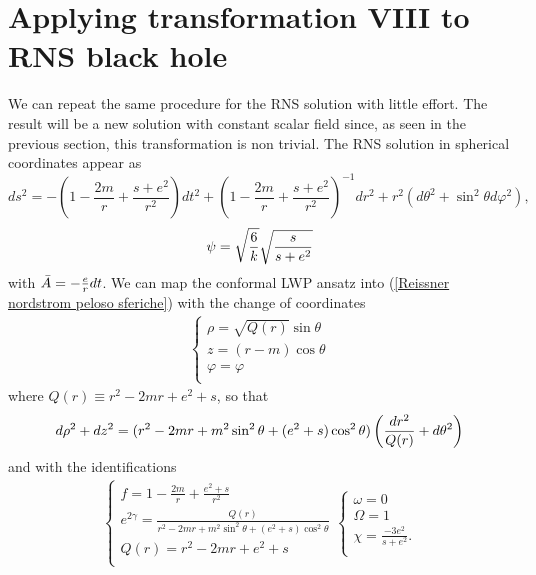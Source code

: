 \section{Applying transformation VIII to RNS black hole} \label{Capitolo RNS + VIII}
We can repeat the same procedure for the RNS solution with little effort. The result will be a new solution with constant scalar field since, as seen in the previous section, this transformation is non trivial.
The RNS solution in spherical coordinates appear as 
\begin{equation}
    ds^2 = -\left(1 -\frac{2m}{r}+\frac{s+e^2}{r^2} \right) dt^2 + \left(1 -\frac{2m}{r}+\frac{s+e^2}{r^2} \right)^{-1} dr^2 + r^2\left(d\theta^2+\sin^2\theta d\varphi^2\right),
    \label{Reissner nordstrom peloso sferiche}
\end{equation}
\begin{equation}
    \psi = \sqrt{\frac{6}{k}}\sqrt{\frac{s}{s+e^2}}
    \notag
\end{equation}
with $\Bar{A} = -\frac{e}{r} dt$. We can map the conformal LWP ansatz into (\ref{Reissner nordstrom peloso sferiche}) with the change of coordinates
\begin{equation*}
    \begin{aligned}
        \begin{cases}
           \rho  = \sqrt{Q(r)}\sin\theta \\
           z = (r-m)\cos\theta \\
           \varphi = \varphi \\
        \end{cases}
    \end{aligned}
    \label{cambio cilindriche sferiche reissner nordstrom}
\end{equation*}
where $Q(r)\equiv r^2-2mr+e^2+s$, so that 
\begin{equation}
    d\rho^2 + dz^2 = (r^2-2mr+m^2\sin^2\theta+(e^2+s)\cos^2\theta)\left(\frac{dr^2}{Q(r)} + d\theta^2\right)
    \notag
\end{equation}
and with the identifications 
\begin{equation*}
    \begin{aligned}
        \begin{cases}
           \displaystyle f  = 1-\frac{2m}{r}+\frac{e^2+s}{r^2} \\[0.5em] 
           \displaystyle e^{2\gamma} = \frac{Q(r)}{r^2-2mr+m^2\sin^2\theta+(e^2+s)\cos^2\theta} \\
           \displaystyle Q(r) = r^2-2mr+e^2+s \\
        \end{cases}
        \begin{cases}
            \omega = 0 \\
            \Omega = 1 \\
            \displaystyle \chi = \frac{-3e^2}{s+e^2}. \\
        \end{cases}
    \end{aligned}
\end{equation*}
